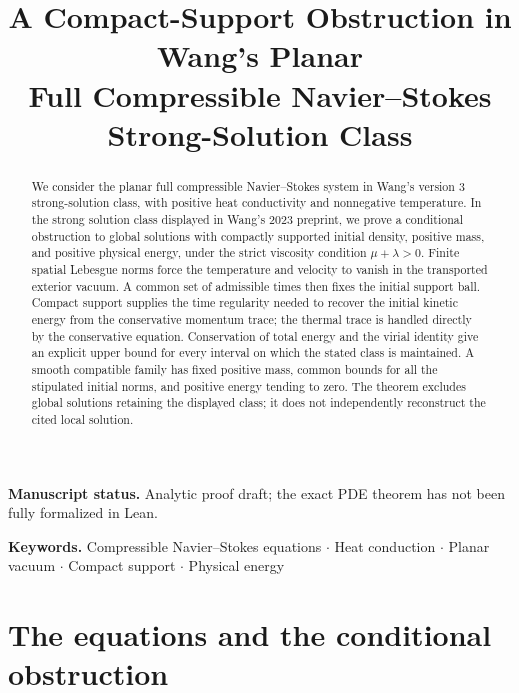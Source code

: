 \documentclass[11pt,letterpaper]{article}
\title{A Compact-Support Obstruction in Wang's Planar\\
Full Compressible Navier--Stokes Strong-Solution Class}
\author{}
\date{}
\numberwithin{equation}{section}
\theoremstyle{definition}
\newcommand{\keywords}[1]{\par\noindent\textbf{Keywords.} #1\par}
\begin{document}
\maketitle

\begin{abstract}
We consider the planar full compressible Navier--Stokes system in
Wang's version 3 strong-solution class, with positive heat conductivity
and nonnegative temperature. In the strong
solution class displayed in Wang's 2023 preprint, we prove a conditional
obstruction to global solutions with compactly supported initial
density, positive mass, and positive physical energy, under the strict
viscosity condition $\mu+\lambda>0$. Finite spatial Lebesgue norms force
the temperature and velocity to vanish in the transported exterior
vacuum. A common set of admissible times then fixes the initial support
ball. Compact support supplies the time regularity needed to recover the
initial kinetic energy from the conservative momentum trace; the
thermal trace is handled directly by the conservative equation.
Conservation of total energy and the virial identity give an explicit
upper bound for every interval on which the stated class is maintained.
A smooth compatible family has fixed positive mass, common bounds for
all the stipulated initial norms, and positive energy tending to zero.
The theorem excludes global solutions retaining the displayed class;
it does not independently reconstruct the cited local solution.
\end{abstract}
\noindent\textbf{Manuscript status.} Analytic proof draft; the exact PDE theorem has not been fully formalized in Lean.\par\medskip
\keywords{Compressible Navier--Stokes equations $\cdot$
Heat conduction $\cdot$ Planar vacuum $\cdot$
Compact support $\cdot$ Physical energy}

\section{The equations and the conditional obstruction}\label{sec:intro}
\end{document}
